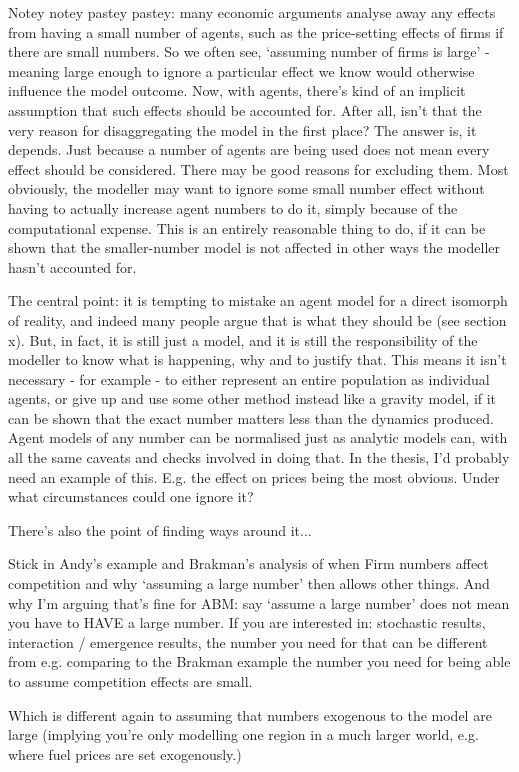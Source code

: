 Notey notey pastey pastey: many economic arguments analyse away any effects from having a small number of agents, such as the price-setting effects of firms if there are small numbers. So we often see, `assuming number of firms is large' - meaning large enough to ignore a particular effect we know would otherwise influence the model outcome. Now, with agents, there's kind of an implicit assumption that such effects should be accounted for. After all, isn't that the very reason for disaggregating the model in the first place? The answer is, it depends. Just because a number of agents are being used does not mean every effect should be considered. There may be good reasons for excluding them. Most obviously, the modeller may want to ignore some small number effect without having to actually increase agent numbers to do it, simply because of the computational expense. This is an entirely reasonable thing to do, if it can be shown that the smaller-number model is not affected in other ways the modeller hasn't accounted for.

The central point: it is tempting to mistake an agent model for a direct isomorph of reality, and indeed many people argue that is what they should be (see section x). But, in fact, it is still just a model, and it is still the responsibility of the modeller to know what is happening, why and to justify that. This means it isn't necessary - for example - to either represent an entire population as individual agents, or give up and use some other method instead like a gravity model, if it can be shown that the exact number matters less than the dynamics produced. Agent models of any number can be normalised just as analytic models can, with all the same caveats and checks involved in doing that.
In the thesis, I'd probably need an example of this. E.g. the effect on prices being the most obvious. Under what circumstances could one ignore it?

There's also the point of finding ways around it... 

Stick in Andy's example and Brakman's analysis of when Firm numbers affect competition and why `assuming a large number' then allows other things. And why I'm arguing that's fine for ABM: say `assume a large number' does not mean you have to HAVE a large number. If you are interested in: stochastic results, interaction / emergence results, the number you need for that can be different from e.g. comparing to the Brakman example the number you need for being able to assume competition effects are small. 

Which is different again to assuming that numbers exogenous to the model are large (implying you're only modelling one region in a much larger world, e.g. where fuel prices are set exogenously.)

